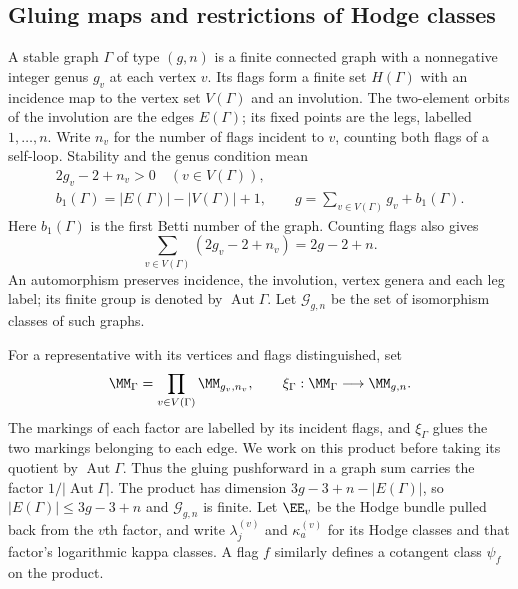 \subsection{Gluing maps and restrictions of Hodge classes}
\label{subsec:s02:03}

A stable graph $\Gamma$ of type $(g,n)$ is a finite connected graph
with a nonnegative integer genus $g_v$ at each vertex $v$.  Its flags
form a finite set $H(\Gamma)$ with an incidence map to the vertex set
$V(\Gamma)$ and an involution.  The two-element orbits of the
involution are the edges $E(\Gamma)$; its fixed points are the legs,
labelled $1,\ldots,n$.  Write $n_v$ for the number of flags incident
to $v$, counting both flags of a self-loop.  Stability and the genus
condition mean
\begin{equation}
\label{eq:s02:graph-genus}
\begin{gathered}
2g_v-2+n_v>0\quad(v\in V(\Gamma)),\\
b_1(\Gamma)=|E(\Gamma)|-|V(\Gamma)|+1,\qquad
g=\sum_{v\in V(\Gamma)}g_v+b_1(\Gamma).
\end{gathered}
\end{equation}
Here $b_1(\Gamma)$ is the first Betti number of the graph.  Counting
flags also gives
\begin{equation}
\label{eq:s02:graph-stability-sum}
\sum_{v\in V(\Gamma)}(2g_v-2+n_v)=2g-2+n.
\end{equation}
An automorphism preserves incidence, the involution, vertex genera and
each leg label; its finite group is denoted by
$\operatorname{Aut}\Gamma$.  Let $\mathcal G_{g,n}$ be the set of
isomorphism classes of such graphs.

For a representative with its vertices and flags distinguished, set
\begin{equation}
\label{eq:s02:gluing-map}
\MM_\Gamma=\prod_{v\in V(\Gamma)}\MM_{g_v,n_v},
\qquad
\xi_\Gamma:\MM_\Gamma\longrightarrow\MM_{g,n}.
\end{equation}
The markings of each factor are labelled by its incident flags, and
$\xi_\Gamma$ glues the two markings belonging to each edge.  We work
on this product before taking its quotient by
$\operatorname{Aut}\Gamma$.  Thus the gluing pushforward in a graph
sum carries the factor $1/|\operatorname{Aut}\Gamma|$.  The product
has dimension $3g-3+n-|E(\Gamma)|$, so $|E(\Gamma)|\leq3g-3+n$
and $\mathcal G_{g,n}$ is finite.  Let $\EE_v$ be the Hodge bundle
pulled back from the $v$th factor, and write $\lambda_j^{(v)}$ and
$\kappa_a^{(v)}$ for its Hodge classes and that factor's logarithmic
kappa classes.  A flag $f$ similarly defines a cotangent class
$\psi_f$ on the product.

